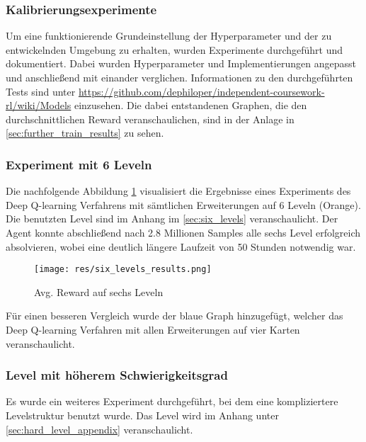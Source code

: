 \documentclass[11pt]{scrartcl}
\begin{document}
\subsubsection{Kalibrierungsexperimente}
\label{sec:calibration_experiments}
Um eine funktionierende Grundeinstellung der Hyperparameter und der zu entwickelnden
Umgebung zu erhalten, wurden Experimente durchgeführt und dokumentiert. Dabei wurden
Hyperparameter und Implementierungen angepasst und anschließend mit einander verglichen.
Informationen zu den durchgeführten Tests sind unter
\url{https://github.com/dephiloper/independent-coursework-rl/wiki/Models} einzusehen. Die
dabei entstandenen Graphen, die den durchschnittlichen Reward veranschaulichen, sind in
der Anlage in \autoref{sec:further_train_results} zu sehen.

\subsubsection{Experiment mit 6 Leveln}
Die nachfolgende Abbildung \ref{fig:six_levels_results} visualisiert die Ergebnisse
eines Experiments des Deep Q-learning Verfahrens mit sämtlichen Erweiterungen auf 6 Leveln
(Orange). Die benutzten Level sind im Anhang im \autoref{sec:six_levels} veranschaulicht.
Der Agent konnte abschließend nach 2.8 Millionen Samples alle sechs Level erfolgreich
absolvieren, wobei eine deutlich längere Laufzeit von 50 Stunden notwendig war.

\begin{figure}[htp]
\centering
\texttt{[image: res/six\_levels\_results.png]}
\caption{Avg. Reward auf sechs Leveln}
\label{fig:six_levels_results}
\end{figure}

Für einen besseren Vergleich wurde der blaue Graph hinzugefügt, welcher das Deep Q-learning
Verfahren mit allen Erweiterungen auf vier Karten veranschaulicht.

\subsubsection{Level mit höherem Schwierigkeitsgrad}
\label{sec:hard_level}
Es wurde ein weiteres Experiment durchgeführt, bei dem eine kompliziertere Levelstruktur
benutzt wurde. Das Level wird im Anhang unter \ref{sec:hard_level_appendix} veranschaulicht.


\end{document}
